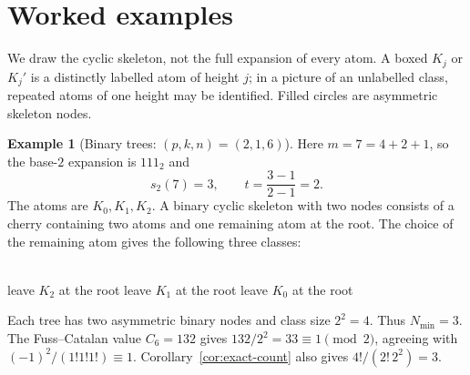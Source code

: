 \documentclass[11pt]{amsart}
\theoremstyle{definition}
\newtheorem{example}[theorem]{Example}
\theoremstyle{remark}
\begin{document}
\section{Worked examples}
We draw the cyclic skeleton, not the full expansion of every atom.  A boxed $K_j$ or $K_j'$ is a distinctly labelled atom of height $j$; in a picture of an unlabelled class, repeated atoms of one height may be identified.  Filled circles are asymmetric skeleton nodes.
\begin{example}[Binary trees: $(p,k,n)=(2,1,6)$]\label{ex:binary}
Here $m=7=4+2+1$, so the base-$2$ expansion is $111_2$ and
\[
 s_2(7)=3,\qquad t=\frac{3-1}{2-1}=2.
\]
The atoms are $K_0,K_1,K_2$.  A binary cyclic skeleton with two nodes consists of a cherry containing two atoms and one remaining atom at the root.  The choice of the remaining atom gives the following three classes:
\begin{center}
\hfill
{}
\hfill
{}\\[3mm]
leave $K_2$ at the root\qquad
leave $K_1$ at the root\qquad
leave $K_0$ at the root
\end{center}
Each tree has two asymmetric binary nodes and class size $2^2=4$.  Thus $N_{\min}=3$.  The Fuss--Catalan value $C_6=132$ gives $132/2^2=33\equiv1\pmod2$, agreeing with $(-1)^2/(1!1!1!)\equiv1$.  Corollary~\ref{cor:exact-count} also gives $4!/(2!\,2^2)=3$.
\end{example}
\end{document}
